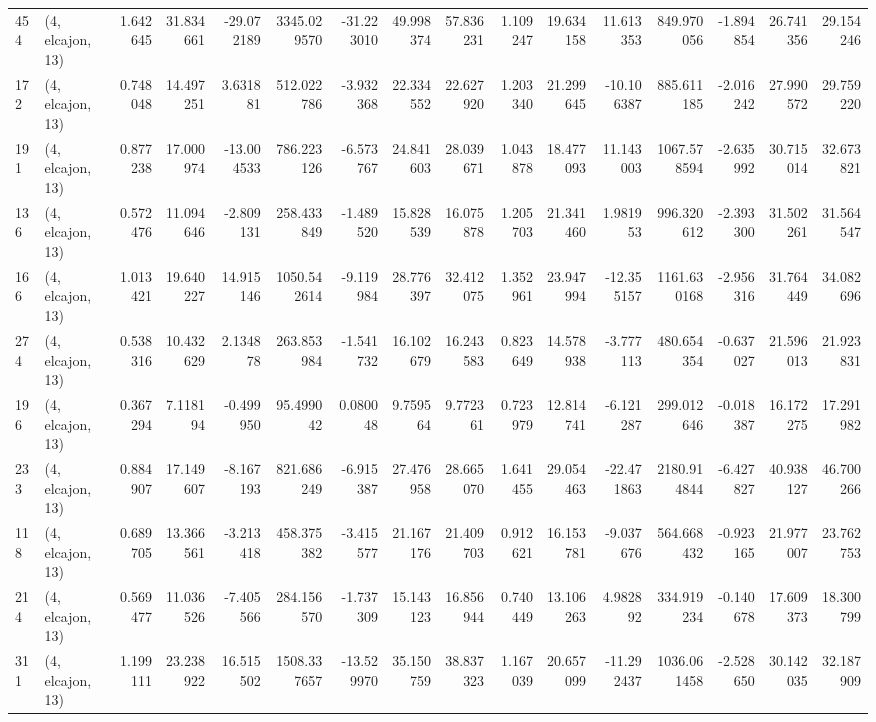 \begin{tabular}{llrrrrrrrrrrrrrr}
454 &  (4, elcajon, 13) &   1.642645 &  31.834661 & -29.072189 &  3345.029570 & -31.223010 &  49.998374 &  57.836231 &  1.109247 &  19.634158 &  11.613353 &    849.970056 &  -1.894854 &  26.741356 &   29.154246 \\
172 &  (4, elcajon, 13) &   0.748048 &  14.497251 &   3.631881 &   512.022786 &  -3.932368 &  22.334552 &  22.627920 &  1.203340 &  21.299645 & -10.106387 &    885.611185 &  -2.016242 &  27.990572 &   29.759220 \\
191 &  (4, elcajon, 13) &   0.877238 &  17.000974 & -13.004533 &   786.223126 &  -6.573767 &  24.841603 &  28.039671 &  1.043878 &  18.477093 &  11.143003 &   1067.578594 &  -2.635992 &  30.715014 &   32.673821 \\
136 &  (4, elcajon, 13) &   0.572476 &  11.094646 &  -2.809131 &   258.433849 &  -1.489520 &  15.828539 &  16.075878 &  1.205703 &  21.341460 &   1.981953 &    996.320612 &  -2.393300 &  31.502261 &   31.564547 \\
166 &  (4, elcajon, 13) &   1.013421 &  19.640227 &  14.915146 &  1050.542614 &  -9.119984 &  28.776397 &  32.412075 &  1.352961 &  23.947994 & -12.355157 &   1161.630168 &  -2.956316 &  31.764449 &   34.082696 \\
274 &  (4, elcajon, 13) &   0.538316 &  10.432629 &   2.134878 &   263.853984 &  -1.541732 &  16.102679 &  16.243583 &  0.823649 &  14.578938 &  -3.777113 &    480.654354 &  -0.637027 &  21.596013 &   21.923831 \\
196 &  (4, elcajon, 13) &   0.367294 &   7.118194 &  -0.499950 &    95.499042 &   0.080048 &   9.759564 &   9.772361 &  0.723979 &  12.814741 &  -6.121287 &    299.012646 &  -0.018387 &  16.172275 &   17.291982 \\
233 &  (4, elcajon, 13) &   0.884907 &  17.149607 &  -8.167193 &   821.686249 &  -6.915387 &  27.476958 &  28.665070 &  1.641455 &  29.054463 & -22.471863 &   2180.914844 &  -6.427827 &  40.938127 &   46.700266 \\
118 &  (4, elcajon, 13) &   0.689705 &  13.366561 &  -3.213418 &   458.375382 &  -3.415577 &  21.167176 &  21.409703 &  0.912621 &  16.153781 &  -9.037676 &    564.668432 &  -0.923165 &  21.977007 &   23.762753 \\
214 &  (4, elcajon, 13) &   0.569477 &  11.036526 &  -7.405566 &   284.156570 &  -1.737309 &  15.143123 &  16.856944 &  0.740449 &  13.106263 &   4.982892 &    334.919234 &  -0.140678 &  17.609373 &   18.300799 \\
311 &  (4, elcajon, 13) &   1.199111 &  23.238922 &  16.515502 &  1508.337657 & -13.529970 &  35.150759 &  38.837323 &  1.167039 &  20.657099 & -11.292437 &   1036.061458 &  -2.528650 &  30.142035 &   32.187909 \\

\end{tabular}
